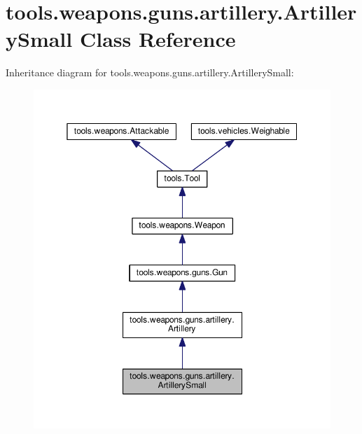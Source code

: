 \hypertarget{classtools_1_1weapons_1_1guns_1_1artillery_1_1_artillery_small}{}\section{tools.\+weapons.\+guns.\+artillery.\+Artillery\+Small Class Reference}
\label{classtools_1_1weapons_1_1guns_1_1artillery_1_1_artillery_small}


Inheritance diagram for tools.\+weapons.\+guns.\+artillery.\+Artillery\+Small\+:
\nopagebreak
\begin{figure}[H]
\begin{center}
\leavevmode
\includegraphics[width=350pt]{classtools_1_1weapons_1_1guns_1_1artillery_1_1_artillery_small__inherit__graph}
\end{center}
\end{figure}


